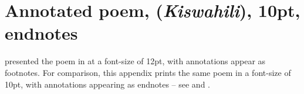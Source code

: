 \chapter{Annotated poem,  (\textit{Kiswahili}), 10pt, endnotes}
\renewcommand{\thesection}{D/\arabic{section}}  %
\setcounter{section}{0}  %
\label{appF}

 presented the poem in \citet{Abdulkadir2013} at a font-size of 12pt, with annotations appear as footnotes.  For comparison, this appendix prints the  same poem in a font-size of 10pt, with annotations appearing as endnotes -- see  and .


